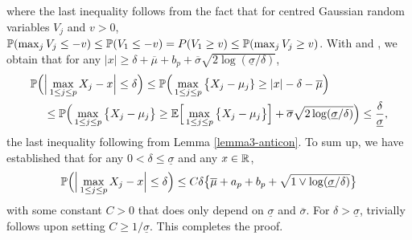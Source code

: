 \documentclass[a4paper,12pt]{article}
\makeatletter
\renewcommand{\eqref}[1]{\tagform@{\ref{#1}}}
\makeatother
\begin{document}
where the last inequality follows from the fact that for centred Gaussian random variables $V_j$ and $v > 0$, $\mathbb{P}(\max_j V_j \le -v) \le \mathbb{P}(V_1 \le -v) = P(V_1 \ge v) \le \mathbb{P}(\max_j V_j \ge v)$. With \eqref{eq-bound3-Levy-prep1} and \eqref{eq-bound3-Levy-prep2}, we obtain that for any $|x| \ge \delta + \overline{\mu} + b_p + \overline{\sigma}\sqrt{2\log(\underline{\sigma}/\delta)}$,
\begin{align*} 
\mathbb{P} \Big( & \Big| \max_{1 \le j \le p} X_j - x \Big| \le \delta \Big) \le \mathbb{P} \Big( \max_{1 \le j \le p} \big\{ X_j - \mu_j \} \ge |x| - \delta - \overline{\mu} \Big) \\
 & \le \mathbb{P} \Big( \max_{1 \le j \le p} \big\{ X_j - \mu_j \big\} \ge \mathbb{E} \Big[ \max_{1 \le j \le p} \big\{ X_j-\mu_j \big\} \Big] + \overline{\sigma} \sqrt{2\log(\underline{\sigma}/\delta)} \Big) \le \frac{\delta}{\underline{\sigma}}, 
\end{align*}
the last inequality following from Lemma \ref{lemma3-anticon}. To sum up, we have established that for any $0 < \delta \le \underline{\sigma}$ and any $x \in \mathbb{R}$, 
\begin{equation}\label{claim-prop-anticon}
\mathbb{P} \Big( \Big| \max_{1 \le j \le p} X_j - x \Big| \le \delta \Big) \le C \delta \big\{ \overline{\mu} + a_p + b_p + \sqrt{1 \vee \log(\underline{\sigma}/\delta)} \big\} 
\end{equation}
with some constant $C > 0$ that does only depend on $\underline{\sigma}$ and $\overline{\sigma}$. For $\delta > \underline{\sigma}$, \eqref{claim-prop-anticon} trivially follows upon setting $C \ge 1/\underline{\sigma}$. This completes the proof. 




\newpage

{\small
\setlength{\bibsep}{0.55em}
}
\end{document}

